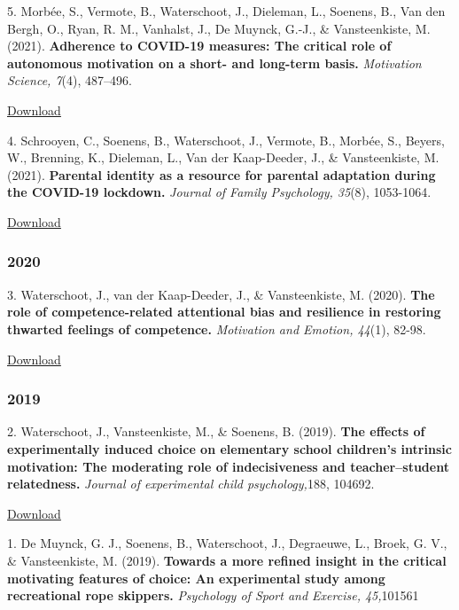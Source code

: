 \documentclass[
]{article}
\begin{document}
5. Morbée, S., Vermote, B., Waterschoot, J., Dieleman, L., Soenens, B.,
Van den Bergh, O., Ryan, R. M., Vanhalst, J., De Muynck, G.-J., \&
Vansteenkiste, M. (2021). \textbf{Adherence to COVID-19 measures: The
critical role of autonomous motivation on a short- and long-term basis.}
\emph{Motivation Science, 7}(4), 487--496.

\href{download/sciencs/studies/2021-95518-001.pdf}{Download }

4. Schrooyen, C., Soenens, B., Waterschoot, J., Vermote, B., Morbée, S.,
Beyers, W., Brenning, K., Dieleman, L., Van der Kaap-Deeder, J., \&
Vansteenkiste, M. (2021). \textbf{Parental identity as a resource for
parental adaptation during the COVID-19 lockdown.} \emph{Journal of
Family Psychology, 35}(8), 1053-1064.

\href{download/sciencs/studies/2021-65223-001.pdf}{Download }

\hypertarget{section-2}{%
\subsubsection{2020}\label{section-2}}

3. Waterschoot, J., van der Kaap-Deeder, J., \& Vansteenkiste, M.
(2020). \textbf{The role of competence-related attentional bias and
resilience in restoring thwarted feelings of competence.}
\emph{Motivation and Emotion, 44}(1), 82-98.

\href{download/sciencs/studies/Waterschoot2020_Article_TheRoleOfCompetence-relatedAtt.pdf}{Download
}

\hypertarget{section-3}{%
\subsubsection{2019}\label{section-3}}

2. Waterschoot, J., Vansteenkiste, M., \& Soenens, B. (2019).
\textbf{The effects of experimentally induced choice on elementary
school children's intrinsic motivation: The moderating role of
indecisiveness and teacher--student relatedness.} \emph{Journal of
experimental child psychology,}188, 104692.

\href{download/sciencs/studies/1-s2.0-S0022096519301110-main.pdf}{Download
}

1. De Muynck, G. J., Soenens, B., Waterschoot, J., Degraeuwe, L., Broek,
G. V., \& Vansteenkiste, M. (2019). \textbf{Towards a more refined
insight in the critical motivating features of choice: An experimental
study among recreational rope skippers.} \emph{Psychology of Sport and
Exercise, 45,}101561
\end{document}
